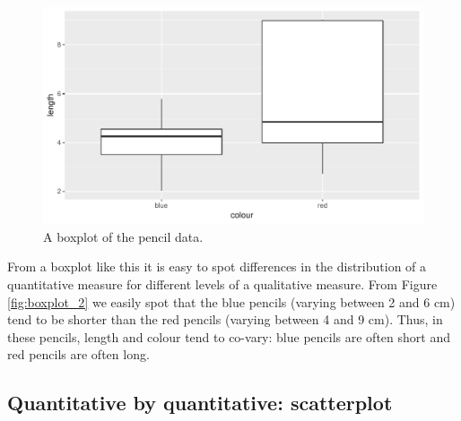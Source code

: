 \documentclass[]{report}\usepackage[]{graphicx}\usepackage[]{color}
\makeatletter
\def\maxwidth{ %
  \ifdim\Gin@nat@width>\linewidth
    \linewidth
  \else
    \Gin@nat@width
  \fi
}
\makeatother
\begin{document}
\begin{figure}

{\centering \includegraphics[width=\maxwidth]{figure/crosstable_3-1} 

}

\caption[A boxplot of the pencil data]{A boxplot of the pencil data.}\label{fig:crosstable_3}
\end{figure}



From a boxplot like this it is easy to spot differences in the distribution of a quantitative measure for different levels of a qualitative measure. From Figure \ref{fig:boxplot_2} we easily spot that the blue pencils (varying between 2 and 6 cm) tend to be shorter than the red pencils (varying between 4 and 9 cm). Thus, in these pencils, length and colour tend to co-vary: blue pencils are often short and red pencils are often long.


\subsection{Quantitative by quantitative: scatterplot}
\end{document}
